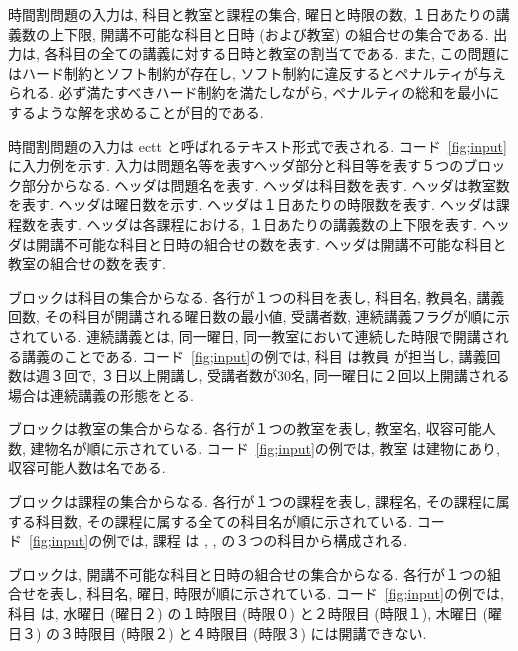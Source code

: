 

時間割問題の入力は, 科目と教室と課程の集合, 曜日と時限の数, １日あたりの講義数の上下限, 開講不可能な科目と日時 (および教室) の組合せの集合である. 出力は, 各科目の全ての講義に対する日時と教室の割当てである. また, この問題にはハード制約とソフト制約が存在し, ソフト制約に違反するとペナルティが与えられる. 必ず満たすべきハード制約を満たしながら, ペナルティの総和を最小にするような解を求めることが目的である.

時間割問題の入力は ectt と呼ばれるテキスト形式で表される. コード~\ref{fig;input}に入力例を示す. 入力は問題名等を表すヘッダ部分と科目等を表す５つのブロック部分からなる.  ヘッダは問題名を表す.  ヘッダは科目数を表す.  ヘッダは教室数を表す.  ヘッダは曜日数を示す.  ヘッダは１日あたりの時限数を表す.  ヘッダは課程数を表す.  ヘッダは各課程における, １日あたりの講義数の上下限を表す.  ヘッダは開講不可能な科目と日時の組合せの数を表す.  ヘッダは開講不可能な科目と教室の組合せの数を表す.

 ブロックは科目の集合からなる. 各行が１つの科目を表し, 科目名, 教員名, 講義回数, その科目が開講される曜日数の最小値, 受講者数, 連続講義フラグが順に示されている. 連続講義とは, 同一曜日, 同一教室において連続した時限で開講される講義のことである. コード~\ref{fig;input}の例では, 科目  は教員  が担当し, 講義回数は週３回で, ３日以上開講し, 受講者数が30名, 同一曜日に２回以上開講される場合は連続講義の形態をとる.

 ブロックは教室の集合からなる. 各行が１つの教室を表し, 教室名, 収容可能人数, 建物名が順に示されている. コード~\ref{fig;input}の例では, 教室  は建物にあり, 収容可能人数は名である.

 ブロックは課程の集合からなる. 各行が１つの課程を表し, 課程名, その課程に属する科目数, その課程に属する全ての科目名が順に示されている. コード~\ref{fig;input}の例では, 課程  は , ,  の３つの科目から構成される.

 ブロックは, 開講不可能な科目と日時の組合せの集合からなる. 各行が１つの組合せを表し, 科目名, 曜日, 時限が順に示されている. コード~\ref{fig;input}の例では, 科目  は, 水曜日 (曜日２) の１時限目 (時限０) と２時限目 (時限１), 木曜日 (曜日３) の３時限目 (時限２) と４時限目 (時限３) には開講できない. 

